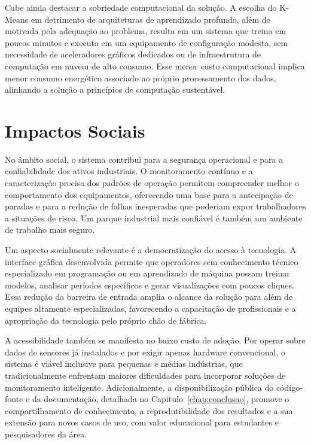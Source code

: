 Cabe ainda destacar a sobriedade computacional da solução. A escolha do K-Means em detrimento de arquiteturas de aprendizado profundo, além de motivada pela adequação ao problema, resulta em um sistema que treina em poucos minutos e executa em um equipamento de configuração modesta, sem necessidade de aceleradores gráficos dedicados ou de infraestrutura de computação em nuvem de alto consumo. Esse menor custo computacional implica menor consumo energético associado ao próprio processamento dos dados, alinhando a solução a princípios de computação sustentável.

\section{Impactos Sociais}

No âmbito social, o sistema contribui para a segurança operacional e para a confiabilidade dos ativos industriais. O monitoramento contínuo e a caracterização precisa dos padrões de operação permitem compreender melhor o comportamento dos equipamentos, oferecendo uma base para a antecipação de paradas e para a redução de falhas inesperadas que poderiam expor trabalhadores a situações de risco. Um parque industrial mais confiável é também um ambiente de trabalho mais seguro.

Um aspecto socialmente relevante é a democratização do acesso à tecnologia. A interface gráfica desenvolvida permite que operadores sem conhecimento técnico especializado em programação ou em aprendizado de máquina possam treinar modelos, analisar períodos específicos e gerar visualizações com poucos cliques. Essa redução da barreira de entrada amplia o alcance da solução para além de equipes altamente especializadas, favorecendo a capacitação de profissionais e a apropriação da tecnologia pelo próprio chão de fábrica.

A acessibilidade também se manifesta no baixo custo de adoção. Por operar sobre dados de sensores já instalados e por exigir apenas hardware convencional, o sistema é viável inclusive para pequenas e médias indústrias, que tradicionalmente enfrentam maiores dificuldades para incorporar soluções de monitoramento inteligente. Adicionalmente, a disponibilização pública do código-fonte e da documentação, detalhada no Capítulo~\ref{chap:conclusao}, promove o compartilhamento de conhecimento, a reprodutibilidade dos resultados e a sua extensão para novos casos de uso, com valor educacional para estudantes e pesquisadores da área.

\clearpage
